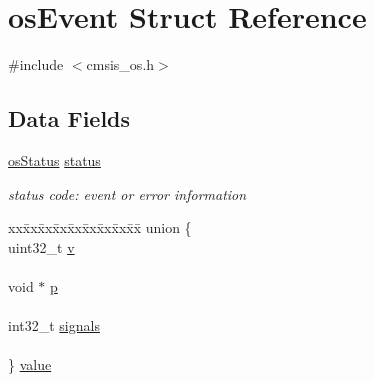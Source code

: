 \hypertarget{structos_event}{}\section{os\+Event Struct Reference}
\label{structos_event}


{\ttfamily \#include $<$cmsis\+\_\+os.\+h$>$}

\subsection*{Data Fields}
\begin{DoxyCompactItemize}
\item 
\mbox{\label{structos_event_ad477a289f1f03ac45407b64268d707d3}} 
\mbox{\hyperlink{cmsis__os_8h_ae2e091fefc4c767117727bd5aba4d99e}{os\+Status}} \mbox{\hyperlink{structos_event_ad477a289f1f03ac45407b64268d707d3}{status}}
\begin{DoxyCompactList}\small\item\em status code\+: event or error information \end{DoxyCompactList}\item 
\mbox{\label{structos_event_ab2eda1adca1b3386a3c580215955b670}} 
\begin{tabbing}
xx\=xx\=xx\=xx\=xx\=xx\=xx\=xx\=xx\=\kill
union \{\\
\>uint32\_t \mbox{\hyperlink{structos_event_a9e0a00edabf3b8a5dafff624fff7bbfc}{v}}\\
\>\\
\>void $\ast$ \mbox{\hyperlink{structos_event_a117104b82864d3b23ec174af6d392709}{p}}\\
\>\\
\>int32\_t \mbox{\hyperlink{structos_event_ad0dda1bf7e74f1576261d493fba232b6}{signals}}\\
\>\\
\} \mbox{\hyperlink{structos_event_ab2eda1adca1b3386a3c580215955b670}{value}}\\


\end{tabbing}
\end{DoxyCompactItemize}

